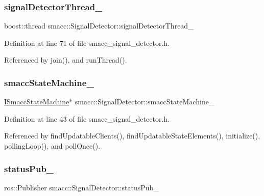 \subsubsection{\texorpdfstring{signal\+Detector\+Thread\+\_\+}{signalDetectorThread\_}}
{\footnotesize\ttfamily boost\+::thread smacc\+::\+Signal\+Detector\+::signal\+Detector\+Thread\+\_\+\hspace{0.3cm}{\ttfamily [private]}}



Definition at line 71 of file smacc\+\_\+signal\+\_\+detector.\+h.



Referenced by join(), and run\+Thread().

\mbox{\label{classsmacc_1_1SignalDetector_a46025de6ac7b5980e22144f9703236a4}} 
\subsubsection{\texorpdfstring{smacc\+State\+Machine\+\_\+}{smaccStateMachine\_}}
{\footnotesize\ttfamily \hyperlink{classsmacc_1_1ISmaccStateMachine}{I\+Smacc\+State\+Machine}$\ast$ smacc\+::\+Signal\+Detector\+::smacc\+State\+Machine\+\_\+\hspace{0.3cm}{\ttfamily [private]}}



Definition at line 43 of file smacc\+\_\+signal\+\_\+detector.\+h.



Referenced by find\+Updatable\+Clients(), find\+Updatable\+State\+Elements(), initialize(), polling\+Loop(), and poll\+Once().

\mbox{\label{classsmacc_1_1SignalDetector_ae065bbd4e699e5fce00fbc508dedd4c1}} 
\subsubsection{\texorpdfstring{status\+Pub\+\_\+}{statusPub\_}}
{\footnotesize\ttfamily ros\+::\+Publisher smacc\+::\+Signal\+Detector\+::status\+Pub\+\_\+\hspace{0.3cm}{\ttfamily [private]}}



